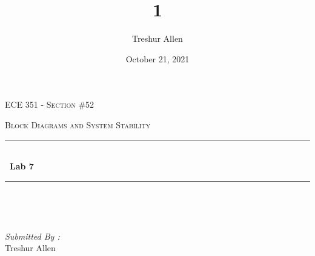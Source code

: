 \documentclass[12pt]{report}
\title{1}
\author{ Treshur Allen}
\date{October 21, 2021}
\begin{document}

\begin{titlepage}
	\centering
    \vspace*{0.5 cm}
\begin{center}    \textsc{\Large   ECE 351 - Section \#52 }\\[2.0 cm]	\end{center}%
	\textsc{\Large Block Diagrams and System Stability  }\\[0.5 cm]				%
	\rule{\linewidth}{0.2 mm} \\[0.4 cm]
	{ \huge \bfseries \ Lab 7}\\
	\rule{\linewidth}{0.2 mm} \\[1.5 cm]
	
	\begin{minipage}{0.4\textwidth}
		\begin{flushleft} \large
			\end{flushleft}
			\end{minipage}~
			\begin{minipage}{0.4\textwidth}
            
			\begin{flushright} \large
			\emph{Submitted By :} \\
			Treshur Allen  
		\end{flushright}
           
	\end{minipage}\\[2 cm]
	
    
    
    
    
	
\end{titlepage}


\tableofcontents
\pagebreak

\renewcommand{\thesection}{\arabic{section}}
\end{document}
